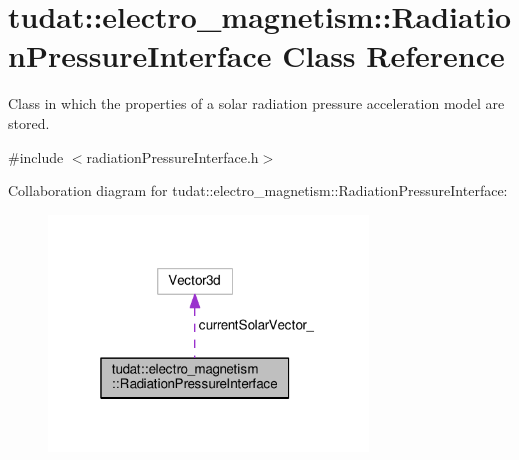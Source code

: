 \hypertarget{classtudat_1_1electro__magnetism_1_1RadiationPressureInterface}{}\section{tudat\+:\+:electro\+\_\+magnetism\+:\+:Radiation\+Pressure\+Interface Class Reference}
\label{classtudat_1_1electro__magnetism_1_1RadiationPressureInterface}


Class in which the properties of a solar radiation pressure acceleration model are stored.  




{\ttfamily \#include $<$radiation\+Pressure\+Interface.\+h$>$}



Collaboration diagram for tudat\+:\+:electro\+\_\+magnetism\+:\+:Radiation\+Pressure\+Interface\+:
\nopagebreak
\begin{figure}[H]
\begin{center}
\leavevmode
\includegraphics[width=241pt]{classtudat_1_1electro__magnetism_1_1RadiationPressureInterface__coll__graph}
\end{center}
\end{figure}
